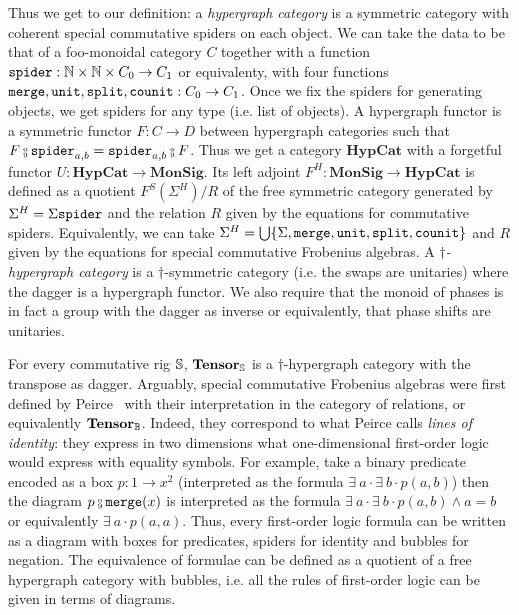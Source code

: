 Thus we get to our definition: a \emph{hypergraph category} is a symmetric category with coherent special commutative spiders on each object.
We can take the data to be that of a foo-monoidal category $C$ together with a function $\spider : \N \times \N \times C_0 \to C_1$ or equivalenty, with four functions $\merge, \unit, \ttsplit, \counit : C_0 \to C_1$.
Once we fix the spiders for generating objects, we get spiders for any type (i.e. list of objects).
A hypergraph functor is a symmetric functor $F : C \to D$ between hypergraph categories such that $F \fcmp \spider_{a, b} = \spider_{a, b} \fcmp F$.
Thus we get a category $\mathbf{HypCat}$ with a forgetful functor $U : \mathbf{HypCat} \to \mathbf{MonSig}$.
Its left adjoint $F^H : \mathbf{MonSig} \to \mathbf{HypCat}$ is defined as a quotient $F^S(\Sigma^H) / R$ of the free symmetric category generated by $\Sigma^H = \Sigma \spider$ and the relation $R$ given by the equations for commutative spiders.
Equivalently, we can take $\Sigma^H = \bigcup \{ \Sigma, \merge, \unit, \ttsplit, \counit \}$ and $R$ given by the equations for special commutative Frobenius algebras.
A \emph{$\dagger$-hypergraph category} is a $\dagger$-symmetric category (i.e. the swaps are unitaries) where the dagger is a hypergraph functor.
We also require that the monoid of phases is in fact a group with the dagger as inverse or equivalently, that phase shifts are unitaries.

\begin{example}
For every commutative rig $\S$, $\mathbf{Tensor}_\S$ is a $\dagger$-hypergraph category with the transpose as dagger.
Arguably, special commutative Frobenius algebras were first defined by Peirce~\cite{Peirce06} with their interpretation in the category of relations, or equivalently $\mathbf{Tensor}_\B$.
Indeed, they correspond to what Peirce calls \emph{lines of identity}: they express in two dimensions what one-dimensional first-order logic would express with equality symbols.
For example, take a binary predicate encoded as a box $p : 1 \to x^2$ (interpreted as the formula $\exists \ a \cdot \exists \ b \cdot p(a, b)$) then the diagram $p \fcmp \merge(x)$ is interpreted as the formula $\exists \ a \cdot \exists \ b \cdot p(a, b) \land a = b$ or equivalently $\exists \ a \cdot p(a, a)$.
Thus, every first-order logic formula can be written as a diagram with boxes for predicates, spiders for identity and bubbles for negation.
The equivalence of formulae can be defined as a quotient of a free hypergraph category with bubbles, i.e. all the rules of first-order logic can be given in terms of diagrams.
\end{example}

